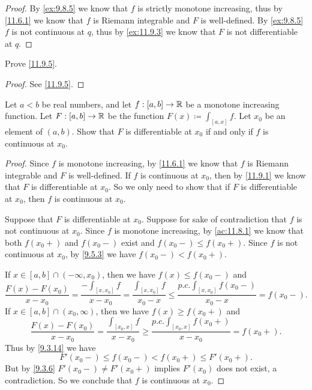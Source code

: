 \begin{proof}
  By \cref{ex:9.8.5} we know that \(f\) is strictly monotone increasing, thus by \cref{11.6.1} we know that \(f\) is Riemann integrable and \(F\) is well-defined.
  By \cref{ex:9.8.5} \(f\) is not continuous at \(q\), thus by \cref{ex:11.9.3} we know that \(F\) is not differentiable at \(q\).
\end{proof}

\begin{ex}\label{ex:11.9.2}
  Prove \cref{11.9.5}.
\end{ex}

\begin{proof}
  See \cref{11.9.5}.
\end{proof}

\begin{ex}\label{ex:11.9.3}
  Let \(a < b\) be real numbers, and let \(f : [a, b] \to \mathbb{R}\) be a monotone increasing function.
  Let \(F : [a, b] \to \mathbb{R}\) be the function \(F(x) \coloneqq \int_{[a, x]} f\).
  Let \(x_0\) be an element of \((a, b)\).
  Show that \(F\) is differentiable at \(x_0\) if and only if \(f\) is continuous at \(x_0\).
\end{ex}

\begin{proof}
  Since \(f\) is monotone increasing, by \cref{11.6.1} we know that \(f\) is Riemann integrable and \(F\) is well-defined.
  If \(f\) is continuous at \(x_0\), then by \cref{11.9.1} we know that \(F\) is differentiable at \(x_0\).
  So we only need to show that if \(F\) is differentiable at \(x_0\), then \(f\) is continuous at \(x_0\).

  Suppose that \(F\) is differentiable at \(x_0\).
  Suppose for sake of contradiction that \(f\) is not continuous at \(x_0\).
  Since \(f\) is monotone increasing, by \cref{ac:11.8.1} we know that both \(f(x_0+)\) and \(f(x_0-)\) exist and \(f(x_0-) \leq f(x_0+)\).
  Since \(f\) is not continuous at \(x_0\), by \cref{9.5.3} we have \(f(x_0-) < f(x_0+)\).

  If \(x \in [a, b] \cap (-\infty, x_0)\), then we have \(f(x) \leq f(x_0-)\) and
  \[
    \dfrac{F(x) - F(x_0)}{x - x_0} = \dfrac{-\int_{[x, x_0]} f}{x - x_0} = \dfrac{\int_{[x, x_0]} f}{x_0 - x} \leq \dfrac{p.c. \int_{[x, x_0]} f(x_0-)}{x_0 - x} = f(x_0-).
  \]
  If \(x \in [a, b] \cap (x_0, \infty)\), then we have \(f(x) \geq f(x_0+)\) and
  \[
    \dfrac{F(x) - F(x_0)}{x - x_0} = \dfrac{\int_{[x_0, x]} f}{x - x_0} \geq \dfrac{p.c. \int_{[x_0, x]} f(x_0+)}{x - x_0} = f(x_0+).
  \]
  Thus by \cref{9.3.14} we have
  \[
    F'(x_0-) \leq f(x_0-) < f(x_0+) \leq F'(x_0+).
  \]
  But by \cref{9.3.6} \(F'(x_0-) \neq F'(x_0+)\) implies \(F'(x_0)\) does not exist, a contradiction.
  So we conclude that \(f\) is continuous at \(x_0\).
\end{proof}